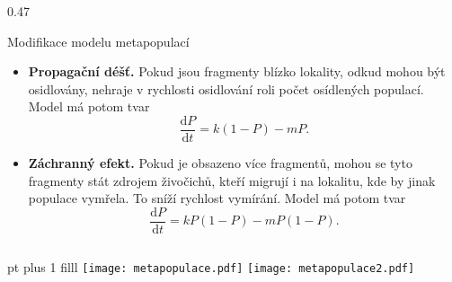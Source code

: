 \documentclass[handouts]{beamer}
\begin{document}
\begin{frame}
\begin{columns}
\begin{column}{0.47\hsize}
\begin{block}{Modifikace modelu metapopulací}
\begin{itemize}
\item \textbf{Propagační déšť.} Pokud jsou fragmenty blízko lokality, odkud mohou být osidlovány, nehraje v rychlosti osidlování roli počet osídlených populací. Model má potom tvar $$\frac{\mathrm dP}{\mathrm dt}=k (1-P) - mP.$$
\item \textbf{Záchranný efekt.} Pokud je obsazeno více fragmentů, mohou se tyto fragmenty stát zdrojem živočichů, kteří migrují i na lokalitu, kde by jinak populace vymřela. To sníží rychlost vymírání. Model má potom tvar
  $$\frac{\mathrm dP}{\mathrm dt}=k P (1-P) - mP(1-P).$$
\end{itemize}
\end{block}
\end{column}

\end{columns}
 pt plus 1 filll
\texttt{[image: metapopulace.pdf]}%
\texttt{[image: metapopulace2.pdf]}

\end{frame}
\end{document}
